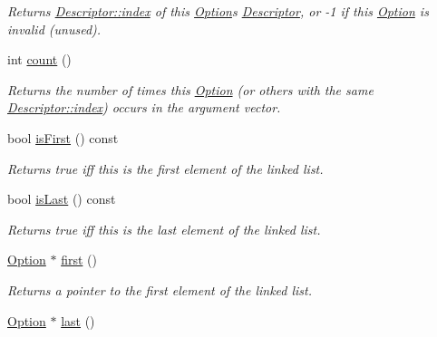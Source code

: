 \begin{DoxyCompactItemize}
\begin{DoxyCompactList}\small\item\em Returns \hyperlink{structxmem_1_1config_1_1third__party_1_1_descriptor_aacf3d44f35c61f22be65da078f60734b}{Descriptor\+::index} of this \hyperlink{classxmem_1_1config_1_1third__party_1_1_option}{Option}\textquotesingle{}s \hyperlink{structxmem_1_1config_1_1third__party_1_1_descriptor}{Descriptor}, or -\/1 if this \hyperlink{classxmem_1_1config_1_1third__party_1_1_option}{Option} is invalid (unused). \end{DoxyCompactList}\item 
int \hyperlink{classxmem_1_1config_1_1third__party_1_1_option_ae10dde777907e632276e585539047576}{count} ()
\begin{DoxyCompactList}\small\item\em Returns the number of times this \hyperlink{classxmem_1_1config_1_1third__party_1_1_option}{Option} (or others with the same \hyperlink{structxmem_1_1config_1_1third__party_1_1_descriptor_aacf3d44f35c61f22be65da078f60734b}{Descriptor\+::index}) occurs in the argument vector. \end{DoxyCompactList}\item 
bool \hyperlink{classxmem_1_1config_1_1third__party_1_1_option_aa15a4bdfb804f7d7431d0895ed4068d2}{is\+First} () const 
\begin{DoxyCompactList}\small\item\em Returns true iff this is the first element of the linked list. \end{DoxyCompactList}\item 
bool \hyperlink{classxmem_1_1config_1_1third__party_1_1_option_a3aa92482d52df551ceb135d9efb34a7f}{is\+Last} () const 
\begin{DoxyCompactList}\small\item\em Returns true iff this is the last element of the linked list. \end{DoxyCompactList}\item 
\hyperlink{classxmem_1_1config_1_1third__party_1_1_option}{Option} $\ast$ \hyperlink{classxmem_1_1config_1_1third__party_1_1_option_a6c8907c4faaf8c099d556db54bfca1a5}{first} ()
\begin{DoxyCompactList}\small\item\em Returns a pointer to the first element of the linked list. \end{DoxyCompactList}\item 
\hyperlink{classxmem_1_1config_1_1third__party_1_1_option}{Option} $\ast$ \hyperlink{classxmem_1_1config_1_1third__party_1_1_option_a79bd212eaf002df298da1b3b46e34cea}{last} ()

\end{DoxyCompactItemize}
